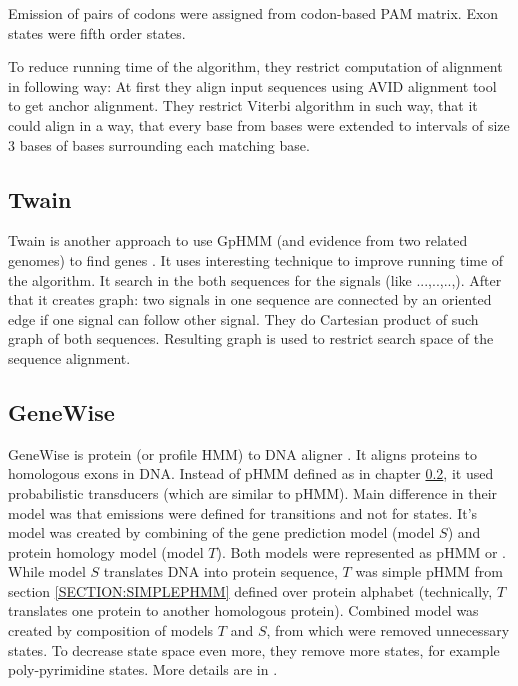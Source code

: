 Emission of pairs of codons were assigned from codon-based PAM matrix. Exon
states were fifth order states.

To reduce running time of the algorithm, they restrict computation of alignment
in following way: At first they  align input sequences using AVID alignment
tool\cite{} to get anchor alignment. They restrict Viterbi algorithm in such
way, that it could align  in a way, that every base from  bases were extended to
intervals of size $3$ bases of bases surrounding each matching base.



\subsection{Twain}

Twain is another approach to use GpHMM (and evidence from two related genomes)
to find genes \cite{Majoros2005}. It uses interesting technique to improve
running time of the algorithm. It search in the both sequences for the signals
(like ...,..,..,). After that it creates graph: two signals in one sequence are
connected by an oriented edge if one signal can follow other signal. They do
Cartesian product of such graph of both sequences. Resulting graph is used to
restrict search space of the sequence alignment.



\subsection{GeneWise}

GeneWise is protein (or profile HMM) to DNA aligner \cite{GeneWise2004}. It aligns
proteins to homologous exons in DNA. Instead of pHMM defined as in chapter
\ref{}, it used probabilistic transducers (which are similar to pHMM). Main
difference in their model was that emissions were defined for transitions and
not for states.  It's model was created by combining of the gene prediction
model (model $S$) and protein homology model (model $T$). Both models were
represented as pHMM or . While model $S$ translates DNA into protein sequence, $T$ was simple pHMM
from section \ref{SECTION:SIMPLEPHMM} defined over protein alphabet
(technically, $T$ translates one protein to another homologous protein).
Combined model was created by composition of models $T$ and $S$, from which were
removed unnecessary states. To decrease state space even more, they remove more
states, for example poly-pyrimidine states. More details are in
\cite{GeneWise2004}.

